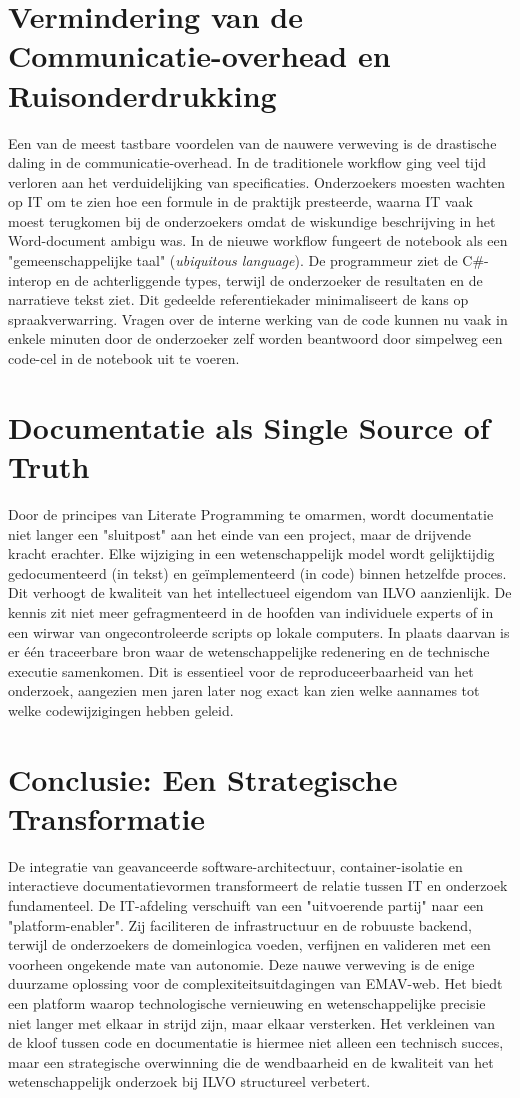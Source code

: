 \section{Vermindering van de Communicatie-overhead en Ruisonderdrukking}
Een van de meest tastbare voordelen van de nauwere verweving is de drastische daling in de communicatie-overhead. In de traditionele workflow ging veel tijd verloren aan het verduidelijking van specificaties. Onderzoekers moesten wachten op IT om te zien hoe een formule in de praktijk presteerde, waarna IT vaak moest terugkomen bij de onderzoekers omdat de wiskundige beschrijving in het Word-document ambigu was.
In de nieuwe workflow fungeert de notebook als een "gemeenschappelijke taal" (\textit{ubiquitous language}). De programmeur ziet de C\#-interop en de achterliggende types, terwijl de onderzoeker de resultaten en de narratieve tekst ziet. Dit gedeelde referentiekader minimaliseert de kans op spraakverwarring. Vragen over de interne werking van de code kunnen nu vaak in enkele minuten door de onderzoeker zelf worden beantwoord door simpelweg een code-cel in de notebook uit te voeren.
\section{Documentatie als \textquotedbl Single Source of Truth\textquotedbl}
Door de principes van Literate Programming te omarmen, wordt documentatie niet langer een "sluitpost" aan het einde van een project, maar de drijvende kracht erachter. Elke wijziging in een wetenschappelijk model wordt gelijktijdig gedocumenteerd (in tekst) en geïmplementeerd (in code) binnen hetzelfde proces.
Dit verhoogt de kwaliteit van het intellectueel eigendom van ILVO aanzienlijk. De kennis zit niet meer gefragmenteerd in de hoofden van individuele experts of in een wirwar van ongecontroleerde scripts op lokale computers. In plaats daarvan is er één traceerbare bron waar de wetenschappelijke redenering en de technische executie samenkomen. Dit is essentieel voor de reproduceerbaarheid van het onderzoek, aangezien men jaren later nog exact kan zien welke aannames tot welke codewijzigingen hebben geleid.
\section{Conclusie: Een Strategische Transformatie}
De integratie van geavanceerde software-architectuur, container-isolatie en interactieve documentatievormen transformeert de relatie tussen IT en onderzoek fundamenteel. De IT-afdeling verschuift van een "uitvoerende partij" naar een "platform-enabler". Zij faciliteren de infrastructuur en de robuuste backend, terwijl de onderzoekers de domeinlogica voeden, verfijnen en valideren met een voorheen ongekende mate van autonomie.
Deze nauwe verweving is de enige duurzame oplossing voor de complexiteitsuitdagingen van EMAV-web. Het biedt een platform waarop technologische vernieuwing en wetenschappelijke precisie niet langer met elkaar in strijd zijn, maar elkaar versterken. Het verkleinen van de kloof tussen code en documentatie is hiermee niet alleen een technisch succes, maar een strategische overwinning die de wendbaarheid en de kwaliteit van het wetenschappelijk onderzoek bij ILVO structureel verbetert.
